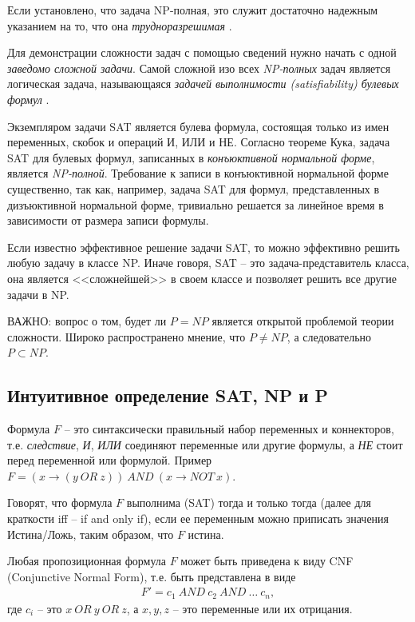 \documentclass[%
	11pt,
	a4paper,
	utf8,
		]{article}
\begin{document}
Если установлено, что задача NP-полная, это служит достаточно надежным указанием на то, что она \emph{трудноразрешимая} \cite[1088]{cormen-algo:2013}.

Для демонстрации сложности задач с помощью сведений нужно начать с одной \emph{заведомо сложной задачи}. {\color{red}Самой сложной изо всех \emph{NP-полных} задач} является логическая задача, называющаяся \emph{задачей выполнимости ({\rmfamily satisfiability}) булевых формул} \cite[351]{skiena-algo:2011}.

Экземпляром задачи SAT является булева формула, состоящая только из имен переменных, скобок и операций И, ИЛИ и НЕ. Согласно теореме Кука, задача SAT для булевых формул, записанных в \emph{конъюктивной нормальной форме}, является \emph{NP-полной}. Требование к записи в конъюктивной нормальной форме существенно, так как, например, задача SAT для формул, представленных в дизъюктивной нормальной форме, тривиально решается за линейное время в зависимости от размера записи формулы.

Если известно эффективное решение задачи SAT, то можно эффективно решить любую задачу в классе NP. Иначе говоря, SAT -- это задача-представитель класса, она является <<сложнейшей>> в своем классе и позволяет решить все другие задачи в NP.

ВАЖНО: вопрос о том, будет ли $ P = NP $ является открытой проблемой теории сложности. Широко распространено мнение, что $ P \neq NP $, а следовательно $ P \subset NP $.

\subsection{Интуитивное определение SAT, NP и P}

Формула $ F $ -- это синтаксически правильный набор переменных и коннекторов, т.е. \emph{следствие}, \emph{И}, \emph{ИЛИ} соединяют переменные или другие формулы, а \emph{НЕ} стоит перед переменной или формулой. Пример $ F = (x \rightarrow (y \ OR \ z)) \ AND \ (x \rightarrow NOT \ x) $.

Говорят, что формула $ F $ выполнима (SAT) тогда и только тогда (далее для краткости iff -- if and only if), если ее переменным можно приписать значения Истина/Ложь, таким образом, что $ F $ истина.

Любая пропозиционная формула $ F $ может быть приведена к виду CNF (Conjunctive Normal Form), т.е. быть представлена в виде
\begin{align*}
	F' = c_1 \ AND \ c_2 \ AND \ \ldots \ c_n,
\end{align*}
где $ c_i $ -- это $ x \ OR \ y \ OR \ z $, а $ x, y, z $ -- это переменные или их отрицания.
\end{document}
